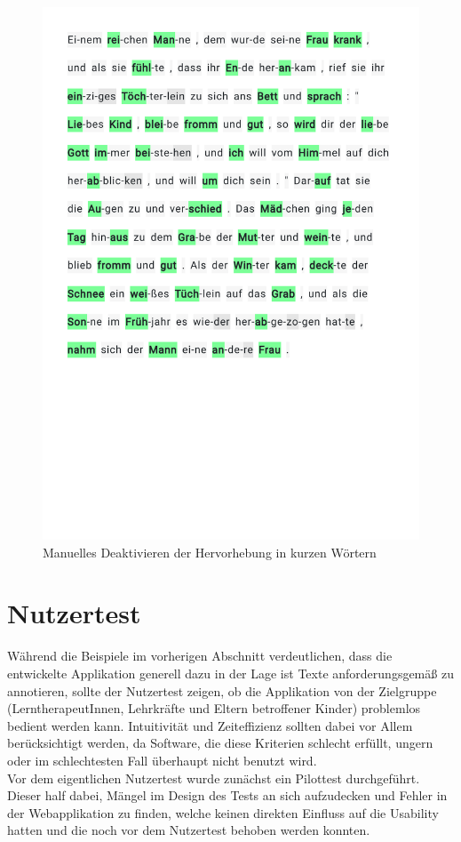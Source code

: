 \begin{figure}[h!]
	\centering
	\includegraphics[width=.7\linewidth, frame]{figures/evaluation/annotation5}
	\caption{Manuelles Deaktivieren der Hervorhebung in kurzen Wörtern}
	\label{fig:evaluation-ex5}
\end{figure}
\newpage

\section{Nutzertest}
\label{sec:usertest}

Während die Beispiele im vorherigen Abschnitt verdeutlichen, dass die entwickelte Applikation generell dazu in der Lage ist Texte anforderungsgemäß zu annotieren, sollte der Nutzertest zeigen, ob die Applikation von der Zielgruppe (LerntherapeutInnen, Lehrkräfte und Eltern betroffener Kinder) problemlos bedient werden kann. Intuitivität und Zeiteffizienz sollten dabei vor Allem berücksichtigt werden, da Software, die diese Kriterien schlecht erfüllt, ungern oder im schlechtesten Fall überhaupt nicht benutzt wird.\\
Vor dem eigentlichen Nutzertest wurde zunächst ein Pilottest durchgeführt. Dieser half dabei, Mängel im Design des Tests an sich aufzudecken und Fehler in der Webapplikation zu finden, welche keinen direkten Einfluss auf die Usability hatten und die noch vor dem Nutzertest behoben werden konnten.

